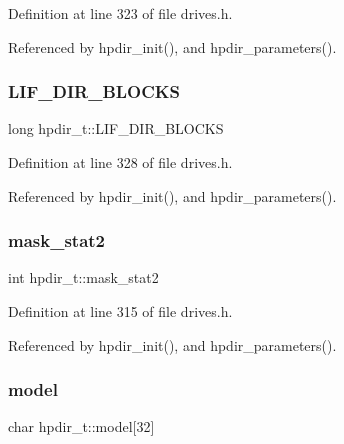 Definition at line 323 of file drives.\+h.



Referenced by hpdir\+\_\+init(), and hpdir\+\_\+parameters().

\mbox{\label{structhpdir__t_a8b6c34460bb1c291860bbb82c56660a4}} 
\subsubsection{\texorpdfstring{L\+I\+F\+\_\+\+D\+I\+R\+\_\+\+B\+L\+O\+C\+KS}{LIF\_DIR\_BLOCKS}}
{\footnotesize\ttfamily long hpdir\+\_\+t\+::\+L\+I\+F\+\_\+\+D\+I\+R\+\_\+\+B\+L\+O\+C\+KS}



Definition at line 328 of file drives.\+h.



Referenced by hpdir\+\_\+init(), and hpdir\+\_\+parameters().

\mbox{\label{structhpdir__t_a0d1e30875c8f50d763e06933fc00f4c8}} 
\subsubsection{\texorpdfstring{mask\+\_\+stat2}{mask\_stat2}}
{\footnotesize\ttfamily int hpdir\+\_\+t\+::mask\+\_\+stat2}



Definition at line 315 of file drives.\+h.



Referenced by hpdir\+\_\+init(), and hpdir\+\_\+parameters().

\mbox{\label{structhpdir__t_acf68613aa50c2bd1f14956167c021d88}} 
\subsubsection{\texorpdfstring{model}{model}}
{\footnotesize\ttfamily char hpdir\+\_\+t\+::model\mbox{[}32\mbox{]}}



